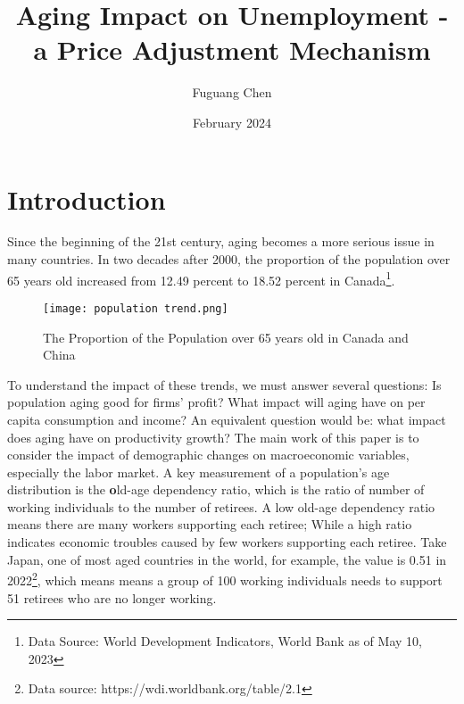 \documentclass[ %
    final,
    scrbook,
    listoffigures,
    listoftables, 
    glossary]{cu-thesis}
\title{Aging Impact on Unemployment - a Price Adjustment Mechanism}
\author{Fuguang Chen}
\date{February 2024}
\begin{document}
    \frontmatter

\chapter{Introduction}
Since the beginning of the 21st century, aging becomes a more serious issue in many countries. In two decades after 2000, the proportion of the population over 65 years old increased from 12.49 percent to 18.52 percent in Canada\footnote{Data Source: World Development Indicators, World Bank as of May 10, 2023}.
\begin{figure}[h]
\centering
\texttt{[image: population trend.png]}
\caption{The Proportion of the Population over 65 years old in Canada and China}
\end{figure}
To understand the impact of these trends, we must answer several questions: Is population aging good for firms' profit? What impact will aging have on per capita consumption and income? An equivalent question would be: what impact does aging have on productivity growth? The main work of this paper is to consider the impact of demographic changes on macroeconomic variables, especially the labor market. A key measurement of a population's age distribution is the {\textbf old-age dependency ratio}, which is the ratio of number of working individuals to the number of retirees.  A low old-age dependency ratio means there are many workers supporting each retiree; While a high ratio indicates economic troubles caused by few workers supporting each retiree. Take Japan, one of most aged countries in the world, for example, the value is 0.51 in 2022\footnote{Data source: https://wdi.worldbank.org/table/2.1}, which means means a group of 100 working individuals needs to support 51 retirees who are no longer working. 
\end{document}
